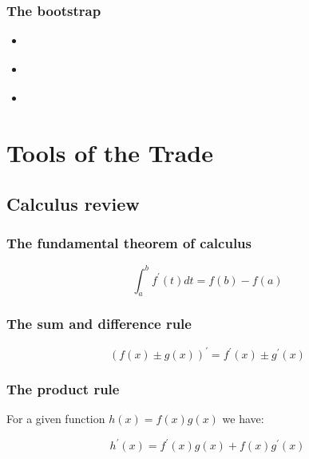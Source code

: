 \documentclass{report}
\begin{document}
\subsection{The bootstrap}

\begin{itemize}
    \item \cite[Chapter~23]{van_der_vaart_asymptotic_1998}
    \item \cite[Chapter~29]{dasgupta_asymptotic_2008}
    \item \cite[Chapter~10.1]{casella_statistical_2002}
\end{itemize}


\chapter{Tools of the Trade} \label{chap:tools-of-the-trade}

\section{Calculus review}\label{sec:tools-calculus}

\subsection{The fundamental theorem of calculus}

\begin{equation}\label{eq:fundamental-theorem-of-calculus}
    \int_a^b f^\prime(t) dt = f(b) - f(a)
\end{equation}

\subsection{The sum and difference rule}

\begin{equation}\label{eq:sum-and-difference-rule}
    (f(x) \pm g(x))^\prime = f^\prime(x) \pm g^\prime(x)
\end{equation}

\subsection{The product rule}

For a given function $h(x) = f(x)g(x)$ we have:

\begin{equation}\label{eq:product-rule}
    h^\prime(x) = f^\prime(x)g(x) + f(x)g^\prime(x)
\end{equation}
\end{document}
